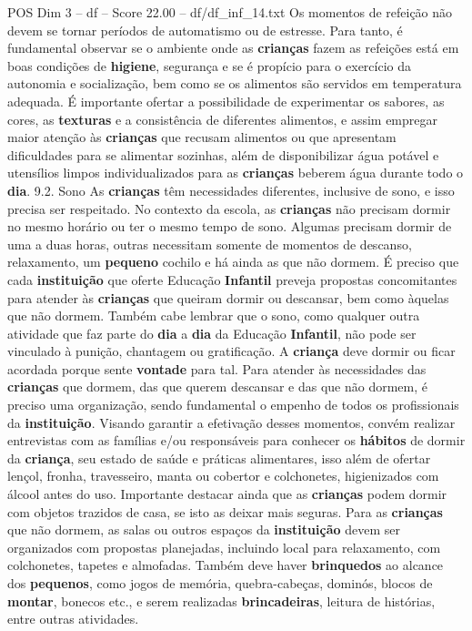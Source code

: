 \begin{textsample}{POS Dim 3 – df – Score 22.00 – df/df\_inf\_14.txt}
Os momentos de refeição não devem se tornar períodos de automatismo ou de estresse.
Para tanto, é fundamental observar se o ambiente onde as \textbf{crianças} fazem as refeições está em boas condições de \textbf{higiene}, segurança e se é propício para o exercício da autonomia e socialização, bem como se os alimentos são servidos em temperatura adequada.
É importante ofertar a possibilidade de experimentar os sabores, as cores, as \textbf{texturas} e a consistência de diferentes alimentos, e assim empregar maior atenção às \textbf{crianças} que recusam alimentos ou que apresentam dificuldades para se alimentar sozinhas, além de disponibilizar água potável e utensílios limpos individualizados para as \textbf{crianças} beberem água durante todo o \textbf{dia}. 9.2.
Sono As \textbf{crianças} têm necessidades diferentes, inclusive de sono, e isso precisa ser respeitado.
No contexto da escola, as \textbf{crianças} não precisam dormir no mesmo horário ou ter o mesmo tempo de sono.
Algumas precisam dormir de uma a duas horas, outras necessitam somente de momentos de descanso, relaxamento, um \textbf{pequeno} cochilo e há ainda as que não dormem.
É preciso que cada \textbf{instituição} que oferte Educação \textbf{Infantil} preveja propostas concomitantes para atender às \textbf{crianças} que queiram dormir ou descansar, bem como àquelas que não dormem.
Também cabe lembrar que o sono, como qualquer outra atividade que faz parte do \textbf{dia} a \textbf{dia} da Educação \textbf{Infantil}, não pode ser vinculado à punição, chantagem ou gratificação.
A \textbf{criança} deve dormir ou ficar acordada porque sente \textbf{vontade} para tal.
Para atender às necessidades das \textbf{crianças} que dormem, das que querem descansar e das que não dormem, é preciso uma organização, sendo fundamental o empenho de todos os profissionais da \textbf{instituição}.
Visando garantir a efetivação desses momentos, convém realizar entrevistas com as famílias e/ou responsáveis para conhecer os \textbf{hábitos} de dormir da \textbf{criança}, seu estado de saúde e práticas alimentares, isso além de ofertar lençol, fronha, travesseiro, manta ou cobertor e colchonetes, higienizados com álcool antes do uso.
Importante destacar ainda que as \textbf{crianças} podem dormir com objetos trazidos de casa, se isto as deixar mais seguras.
Para as \textbf{crianças} que não dormem, as salas ou outros espaços da \textbf{instituição} devem ser organizados com propostas planejadas, incluindo local para relaxamento, com colchonetes, tapetes e almofadas.
Também deve haver \textbf{brinquedos} ao alcance dos \textbf{pequenos}, como jogos de memória, quebra-cabeças, dominós, blocos de \textbf{montar}, bonecos etc., e serem realizadas \textbf{brincadeiras}, leitura de histórias, entre outras atividades.

\end{textsample}
